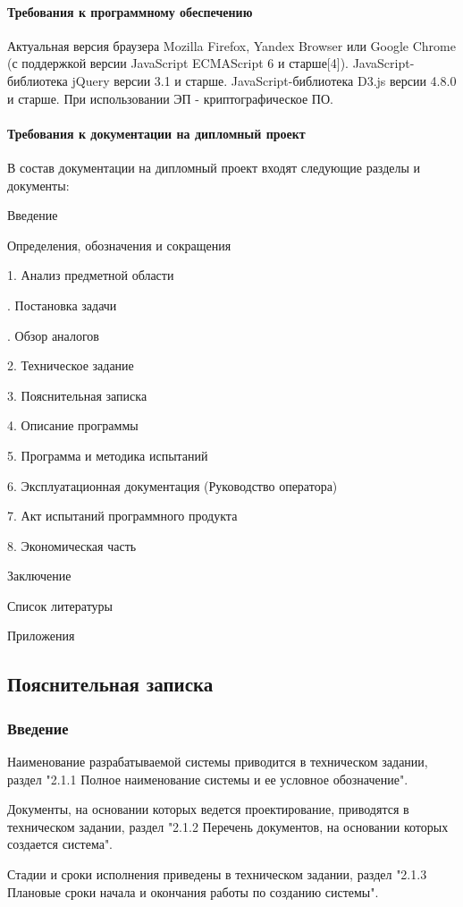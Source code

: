 \documentclass[a4paper]{extarticle}
\numberwithin{equation}{section}
\begin{document}
\paragraph{Требования к программному обеспечению}
Актуальная версия браузера Mozilla Firefox, Yandex Browser или Google Chrome (с поддержкой версии JavaScript ECMAScript 6 и старше[4]). JavaScript-библиотека jQuery версии 3.1 и старше. JavaScript-библиотека D3.js версии 4.8.0 и старше. При использовании ЭП - криптографическое ПО.

\paragraph{Требования к документации на дипломный проект}
В состав документации на дипломный проект входят следующие разделы и документы:\par
Введение\par
\qquad Определения, обозначения и сокращения\par
1.	Анализ предметной области\par
{}.	Постановка задачи\par
{}.	Обзор аналогов\par
2.	Техническое задание\par
3.	Пояснительная записка\par
4.	Описание программы\par
5.	Программа и методика испытаний\par
6.	Эксплуатационная документация (Руководство оператора)\par
7.	Акт испытаний программного продукта\par
8.	Экономическая часть\par
Заключение\par
Список литературы\par
Приложения\par

\subsection{Пояснительная записка}

\subsubsection*{Введение}
Наименование разрабатываемой системы приводится в техническом задании, раздел "2.1.1 Полное наименование системы и ее условное обозначение".\par
Документы, на основании которых ведется проектирование, приводятся в техническом задании, раздел "2.1.2 Перечень документов, на основании которых создается система".\par
Стадии и сроки исполнения приведены в техническом задании, раздел "2.1.3 Плановые сроки начала и окончания работы по созданию системы".
\end{document}
